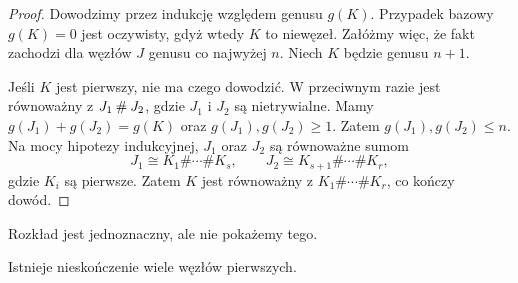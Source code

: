 \begin{proof}
    Dowodzimy przez indukcję względem genusu $g(K)$.
    Przypadek bazowy $g(K) = 0$ jest oczywisty, gdyż wtedy $K$ to niewęzeł.
    Załóżmy więc, że fakt zachodzi dla węzłów $J$ genusu co najwyżej $n$.
    Niech $K$ będzie genusu $n + 1$.

    Jeśli $K$ jest pierwszy, nie ma czego dowodzić.
    W przeciwnym razie jest równoważny z $J_1 \mathbin{\#} J_2$, gdzie $J_1$ i $J_2$ są nietrywialne.
    Mamy $g(J_1)+g(J_2)=g(K)$ oraz $g(J_1),g(J_2)\geqslant 1$.
    Zatem $g(J_1),g(J_2)\leqslant n$.
    Na mocy hipotezy indukcyjnej, $J_1$ oraz $J_2$ są równoważne sumom
    \[
        J_1 \cong K_1\#\cdots\# K_s,\qquad
        J_2 \cong K_{s+1}\#\cdots\# K_r,
    \]
    gdzie $K_i$ są pierwsze.
    Zatem $K$ jest równoważny z $K_1\#\cdots\# K_r$, co kończy dowód.
\end{proof}

Rozkład jest jednoznaczny, ale nie pokażemy tego.

\begin{proposition} \label{infty_primes}
Istnieje nieskończenie wiele węzłów pierwszych.
\end{proposition}

